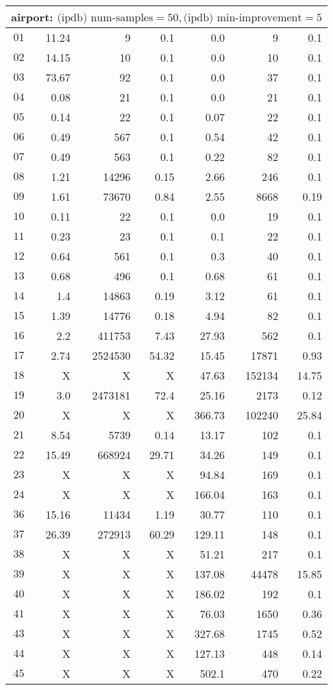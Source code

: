 \begin{longtable}{|c||r|r|r||r|r|r|}
\multicolumn{7}{|l|}{airport: $\text{(ipdb) num-samples}=50,\text{(ipdb) min-improvement}=5$}\\\hline
$01$ & 11.24 & 9 & 0.1 &0.0 & 9 & 0.1 \\\hline
$02$ & 14.15 & 10 & 0.1 &0.0 & 10 & 0.1 \\\hline
$03$ & 73.67 & 92 & 0.1 &0.0 & 37 & 0.1 \\\hline
$04$ & 0.08 & 21 & 0.1 &0.0 & 21 & 0.1 \\\hline
$05$ & 0.14 & 22 & 0.1 &0.07 & 22 & 0.1 \\\hline
$06$ & 0.49 & 567 & 0.1 &0.54 & 42 & 0.1 \\\hline
$07$ & 0.49 & 563 & 0.1 &0.22 & 82 & 0.1 \\\hline
$08$ & 1.21 & 14296 & 0.15 &2.66 & 246 & 0.1 \\\hline
$09$ & 1.61 & 73670 & 0.84 &2.55 & 8668 & 0.19 \\\hline
$10$ & 0.11 & 22 & 0.1 &0.0 & 19 & 0.1 \\\hline
$11$ & 0.23 & 23 & 0.1 &0.1 & 22 & 0.1 \\\hline
$12$ & 0.64 & 561 & 0.1 &0.3 & 40 & 0.1 \\\hline
$13$ & 0.68 & 496 & 0.1 &0.68 & 61 & 0.1 \\\hline
$14$ & 1.4 & 14863 & 0.19 &3.12 & 61 & 0.1 \\\hline
$15$ & 1.39 & 14776 & 0.18 &4.94 & 82 & 0.1 \\\hline
$16$ & 2.2 & 411753 & 7.43 &27.93 & 562 & 0.1 \\\hline
$17$ & 2.74 & 2524530 & 54.32 &15.45 & 17871 & 0.93 \\\hline
$18$ & X & X & X &47.63 & 152134 & 14.75 \\\hline
$19$ & 3.0 & 2473181 & 72.4 &25.16 & 2173 & 0.12 \\\hline
$20$ & X & X & X &366.73 & 102240 & 25.84 \\\hline
$21$ & 8.54 & 5739 & 0.14 &13.17 & 102 & 0.1 \\\hline
$22$ & 15.49 & 668924 & 29.71 &34.26 & 149 & 0.1 \\\hline
$23$ & X & X & X &94.84 & 169 & 0.1 \\\hline
$24$ & X & X & X &166.04 & 163 & 0.1 \\\hline
$36$ & 15.16 & 11434 & 1.19 &30.77 & 110 & 0.1 \\\hline
$37$ & 26.39 & 272913 & 60.29 &129.11 & 148 & 0.1 \\\hline
$38$ & X & X & X &51.21 & 217 & 0.1 \\\hline
$39$ & X & X & X &137.08 & 44478 & 15.85 \\\hline
$40$ & X & X & X &186.02 & 192 & 0.1 \\\hline
$41$ & X & X & X &76.03 & 1650 & 0.36 \\\hline
$43$ & X & X & X &327.68 & 1745 & 0.52 \\\hline
$44$ & X & X & X &127.13 & 448 & 0.14 \\\hline
$45$ & X & X & X &502.1 & 470 & 0.22 \\\hline



\end{longtable}
